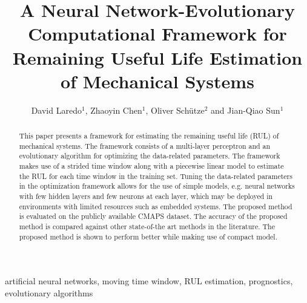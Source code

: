


\begin{frontmatter}

\title{A Neural Network-Evolutionary Computational Framework for Remaining Useful Life Estimation of Mechanical Systems}

\author{David Laredo$^{1}$, Zhaoyin Chen$^{1}$, Oliver Sch\"utze$^{2}$ and Jian-Qiao Sun$^{1}$}
\address{
$^{1}$Department of Mechanical Engineering\\
School of Engineering, University of California\\
Merced, CA 95343, USA\\
$^{2}$Department of Computer Science, CINVESTAV\\ 
Mexico City, Mexico\\
Corresponding author. Email: jqsun@ucmerced.edu}

\begin{abstract}
This paper presents a framework for estimating the remaining useful life (RUL) of mechanical systems. The framework consists of a multi-layer perceptron and an evolutionary algorithm for optimizing the data-related parameters. The framework makes use of a strided time window along with a piecewise linear model to estimate the RUL for each time window in the training set. Tuning the data-related parameters in the optimization framework allows for the use of simple models, e.g. neural networks with few hidden layers and few neurons at each layer, which may be deployed in environments with limited resources such as embedded systems. The proposed method is evaluated on the publicly available CMAPS dataset. The accuracy of the proposed method is compared against other state-of-the art methods in the literature. The proposed method is shown to perform better while making use of compact model.

\end{abstract}


\begin{keyword}
artificial neural networks\sep
moving time window\sep
RUL estimation\sep
prognostics\sep
evolutionary algorithms
\end{keyword}

\end{frontmatter}
